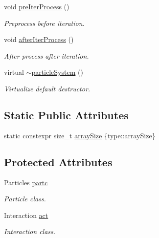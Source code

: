 \begin{DoxyCompactItemize}
void \mbox{\hyperlink{classparticle_system_a14ee76644ab1bacc3ed4a66e4fff0fb1}{pre\+Iter\+Process}} ()
\begin{DoxyCompactList}\small\item\em Preprocess before iteration. \end{DoxyCompactList}\item 
void \mbox{\hyperlink{classparticle_system_a12fa297e1f6674847c2b90761f30d336}{after\+Iter\+Process}} ()
\begin{DoxyCompactList}\small\item\em After process after iteration. \end{DoxyCompactList}\item 
virtual \mbox{\hyperlink{classparticle_system_a56d066b7151be7bdb05f64349d44581e}{$\sim$particle\+System}} ()
\begin{DoxyCompactList}\small\item\em Virtualize default destructor. \end{DoxyCompactList}\end{DoxyCompactItemize}
\subsection*{Static Public Attributes}
\begin{DoxyCompactItemize}
\item 
static constexpr size\+\_\+t \mbox{\hyperlink{classparticle_system_a546e31d7390df18688216898c6f610f9}{array\+Size}} \{type\+::array\+Size\}
\end{DoxyCompactItemize}
\subsection*{Protected Attributes}
\begin{DoxyCompactItemize}
\item 
Particles \mbox{\hyperlink{classparticle_system_a48cb24fbd9d72503a5e464a02760e814}{partc}}
\begin{DoxyCompactList}\small\item\em Particle class. \end{DoxyCompactList}\item 
Interaction \mbox{\hyperlink{classparticle_system_a41e5c73bc46164302db25b5c5d28aedd}{act}}
\begin{DoxyCompactList}\small\item\em Interaction class. \end{DoxyCompactList}\end{DoxyCompactItemize}
